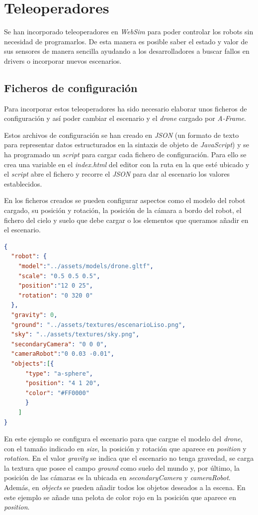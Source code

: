 \section{Teleoperadores}
Se han incorporado teleoperadores en \textit{WebSim} para poder controlar los robots sin necesidad de programarlos. De esta manera es posible saber el estado y valor de sus sensores de manera sencilla ayudando a los desarrolladores a buscar fallos en drivers o incorporar nuevos escenarios. 

\subsection{Ficheros de configuración}

Para incorporar estos teleoperadores ha sido necesario elaborar unos ficheros de configuración y así poder cambiar el escenario y el \textit{drone} cargado por \textit{A-Frame}. 

Estos archivos de configuración se han creado en \textit{JSON} (un formato de texto para representar datos estructurados en la sintaxis de objeto de \textit{JavaScript}) y se ha programado un \textit{script} para cargar cada fichero de configuración. Para ello se crea una variable en el \textit{index.html} del editor con la ruta en la que esté ubicado y el \textit{script} abre el fichero y recorre el \textit{JSON} para dar al escenario los valores establecidos. \newline

En los ficheros creados se pueden configurar aspectos como el modelo del robot cargado, su posición y rotación, la posición de la cámara a bordo del robot, el fichero del cielo y suelo que debe cargar o los elementos que queramos añadir en el escenario. \newline

\begin{lstlisting}[language=json, caption=Ejemplo de fichero de configuración]
  {
  "robot": {
    "model":"../assets/models/drone.gltf",
    "scale": "0.5 0.5 0.5",
    "position":"12 0 25",
    "rotation": "0 320 0"
  },
  "gravity": 0,
  "ground": "../assets/textures/escenarioLiso.png",
  "sky": "../assets/textures/sky.png",
  "secondaryCamera": "0 0 0",
  "cameraRobot":"0 0.03 -0.01",
  "objects":[{
      "type": "a-sphere",
      "position": "4 1 20",
      "color": "#FF0000"
      }
    ]
}
\end{lstlisting}

En este ejemplo se configura el escenario para que cargue el modelo del \textit{drone}, con el tamaño indicado en \textit{size}, la posición y rotación que aparece en \textit{position} y \textit{rotation}. En el valor \textit{gravity} se indica que el escenario no tenga gravedad, se carga la textura que posee el campo \textit{ground} como suelo del mundo y, por último, la posición de las cámaras es la ubicada en \textit{secondaryCamera} y \textit{cameraRobot}. Además, en \textit{objects} se pueden añadir todos los objetos deseados a la escena. En este ejemplo se añade una pelota de color rojo en la posición que aparece en \textit{position}.

